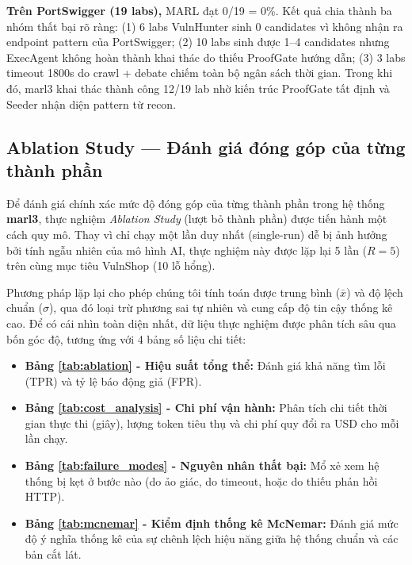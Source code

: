 \textbf{Trên PortSwigger (19 labs),} MARL đạt 0/19 = 0\%. Kết quả chia thành ba nhóm thất bại rõ ràng: (1) 6 labs VulnHunter sinh 0 candidates vì không nhận ra endpoint pattern của PortSwigger; (2) 10 labs sinh được 1--4 candidates nhưng ExecAgent không hoàn thành khai thác do thiếu ProofGate hướng dẫn; (3) 3 labs timeout 1800s do crawl + debate chiếm toàn bộ ngân sách thời gian. Trong khi đó, marl3 khai thác thành công 12/19 lab nhờ kiến trúc ProofGate tất định và Seeder nhận diện pattern từ recon.

\subsection{Ablation Study --- Đánh giá đóng góp của từng thành phần}
\label{sec:ablation}

Để đánh giá chính xác mức độ đóng góp của từng thành phần trong hệ thống \textbf{marl3}, thực nghiệm \textit{Ablation Study} (lượt bỏ thành phần) được tiến hành một cách quy mô. Thay vì chỉ chạy một lần duy nhất (single-run) dễ bị ảnh hưởng bởi tính ngẫu nhiên của mô hình AI, thực nghiệm này được lặp lại 5 lần ($R=5$) trên cùng mục tiêu VulnShop (10 lỗ hổng).

Phương pháp lặp lại cho phép chúng tôi tính toán được trung bình ($\bar{x}$) và độ lệch chuẩn ($\sigma$), qua đó loại trừ phương sai tự nhiên và cung cấp độ tin cậy thống kê cao. Để có cái nhìn toàn diện nhất, dữ liệu thực nghiệm được phân tích sâu qua bốn góc độ, tương ứng với 4 bảng số liệu chi tiết:

\begin{itemize}
    \item \textbf{Bảng \ref{tab:ablation} - Hiệu suất tổng thể:} Đánh giá khả năng tìm lỗi (TPR) và tỷ lệ báo động giả (FPR).
    \item \textbf{Bảng \ref{tab:cost_analysis} - Chi phí vận hành:} Phân tích chi tiết thời gian thực thi (giây), lượng token tiêu thụ và chi phí quy đổi ra USD cho mỗi lần chạy.
    \item \textbf{Bảng \ref{tab:failure_modes} - Nguyên nhân thất bại:} Mổ xẻ xem hệ thống bị kẹt ở bước nào (do ảo giác, do timeout, hoặc do thiếu phản hồi HTTP).
    \item \textbf{Bảng \ref{tab:mcnemar} - Kiểm định thống kê McNemar:} Đánh giá mức độ ý nghĩa thống kê của sự chênh lệch hiệu năng giữa hệ thống chuẩn và các bản cắt lát.
\end{itemize}

